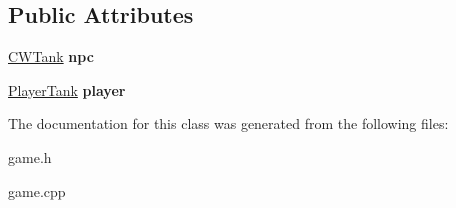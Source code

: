 \subsection*{Public Attributes}
\begin{DoxyCompactItemize}
\item 
\mbox{\label{class_game_a96bb9a9bbedbac24f9b230122f663f0c}} 
\mbox{\hyperlink{class_c_w_tank}{C\+W\+Tank}} {\bfseries npc}
\item 
\mbox{\label{class_game_a6b08b37ec5feb1f05188fe86d83615e7}} 
\mbox{\hyperlink{class_player_tank}{Player\+Tank}} {\bfseries player}
\end{DoxyCompactItemize}


The documentation for this class was generated from the following files\+:\begin{DoxyCompactItemize}
\item 
game.\+h\item 
game.\+cpp\end{DoxyCompactItemize}
